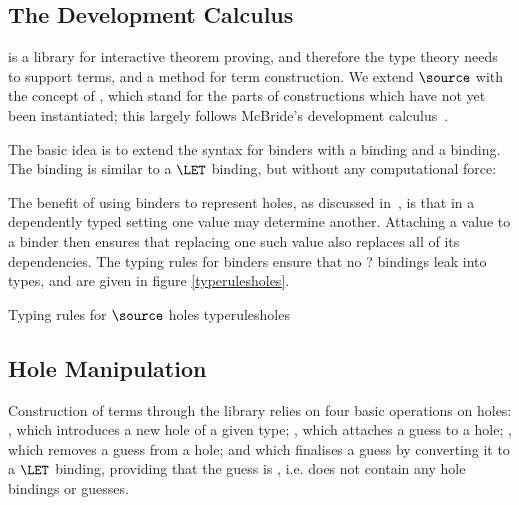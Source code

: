 \subsection{The Development Calculus}

\Ivor{} is a library for interactive theorem proving, and therefore
the type theory needs to support  terms, and a
method for term construction. We extend $\source$ with the concept of
, which stand for the parts of constructions which have
not yet been instantiated; this largely follows McBride's \Oleg{}
development calculus~\cite{mcbride-thesis}.

The basic idea is to extend the syntax for binders with a 
binding and a  binding. The  binding is
similar to a $\LET$ binding, but without any computational force:


The benefit of using binders to represent holes, as discussed
in~\cite{mcbride-thesis}, is that in a dependently typed setting one
value may determine another. Attaching a value to a binder then
ensures that replacing one such value also replaces all of its
dependencies. The typing rules for binders ensure that no ? bindings
leak into types, and are given in figure \ref{typerulesholes}.

{Typing rules for $\source$ holes}
{typerulesholes}

\subsection{Hole Manipulation}

\label{holeops}

Construction of terms through the \Ivor{} library relies on four basic
operations on holes: , which introduces a new hole of a
given type; , which attaches a guess to a hole;
, which removes a guess from a hole; and 
which finalises a guess by converting it to a $\LET$ binding,
providing that the guess is , i.e. does not contain any
hole bindings or guesses.

